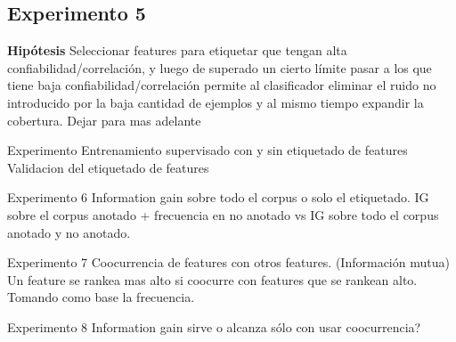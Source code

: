 \subsection{Experimento 5}
\textbf{Hipótesis} Seleccionar features para etiquetar que tengan alta confiabilidad/correlación, y luego de superado un cierto límite pasar a los que tiene baja confiabilidad/correlación permite al clasificador eliminar el ruido no introducido por la baja cantidad de ejemplos y al mismo tiempo expandir la cobertura.
Dejar para mas adelante


Experimento Entrenamiento supervisado con y sin etiquetado de  features
Validacion del etiquetado de features



Experimento 6
Information gain sobre todo el corpus o solo el etiquetado.
IG sobre el corpus anotado + frecuencia en no anotado vs IG sobre todo el corpus anotado y no anotado.


Experimento 7
Coocurrencia de features con otros features. (Información mutua)
Un feature se rankea mas alto si coocurre con features que se rankean alto. Tomando como base la frecuencia.

Experimento 8
Information gain sirve o alcanza sólo con usar coocurrencia?
